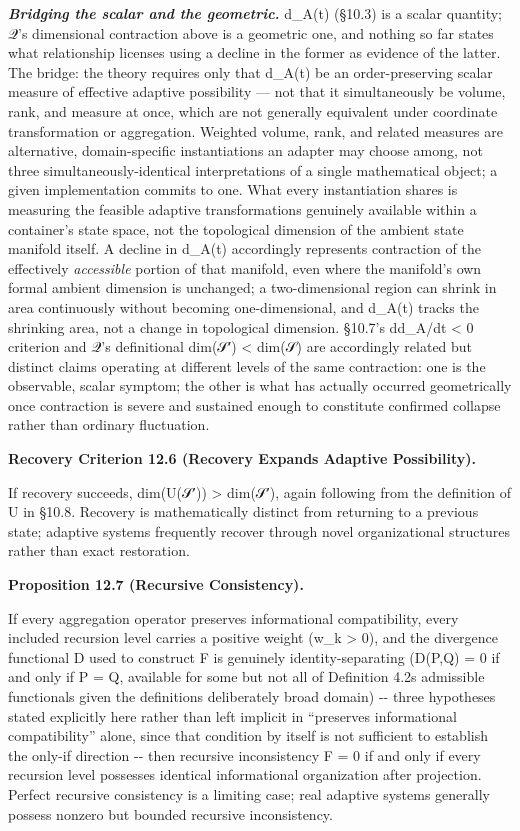 \documentclass[
]{article}
\begin{document}
\emph{\textbf{Bridging the scalar and the geometric.}} d\_A(t) (§10.3)
is a scalar quantity; 𝒬's dimensional contraction above is a geometric
one, and nothing so far states what relationship licenses using a
decline in the former as evidence of the latter. The bridge: the theory
requires only that d\_A(t) be an order-preserving scalar measure of
effective adaptive possibility --- not that it simultaneously be volume,
rank, and measure at once, which are not generally equivalent under
coordinate transformation or aggregation. Weighted volume, rank, and
related measures are alternative, domain-specific instantiations an
adapter may choose among, not three simultaneously-identical
interpretations of a single mathematical object; a given implementation
commits to one. What every instantiation shares is measuring the
feasible adaptive transformations genuinely available within a
container's state space, not the topological dimension of the ambient
state manifold itself. A decline in d\_A(t) accordingly represents
contraction of the effectively \emph{accessible} portion of that
manifold, even where the manifold's own formal ambient dimension is
unchanged; a two-dimensional region can shrink in area continuously
without becoming one-dimensional, and d\_A(t) tracks the shrinking area,
not a change in topological dimension. §10.7's dd\_A/dt \textless{} 0
criterion and 𝒬's definitional dim(𝒮′) \textless{} dim(𝒮) are
accordingly related but distinct claims operating at different levels of
the same contraction: one is the observable, scalar symptom; the other
is what has actually occurred geometrically once contraction is severe
and sustained enough to constitute confirmed collapse rather than
ordinary fluctuation.

\textbf{Recovery Criterion 12.6 (Recovery Expands Adaptive
Possibility).}

If recovery succeeds, dim(U(𝒮′)) \textgreater{} dim(𝒮′), again following
from the definition of U in §10.8. Recovery is mathematically distinct
from returning to a previous state; adaptive systems frequently recover
through novel organizational structures rather than exact restoration.

\textbf{Proposition 12.7 (Recursive Consistency).}

If every aggregation operator preserves informational compatibility,
every included recursion level carries a positive weight (w\_k
\textgreater{} 0), and the divergence functional D used to construct F
is genuinely identity-separating (D(P,Q) = 0 if and only if P = Q,
available for some but not all of Definition 4.2s admissible functionals
given the definitions deliberately broad domain) -\/- three hypotheses
stated explicitly here rather than left implicit in ``preserves
informational compatibility'' alone, since that condition by itself is
not sufficient to establish the only-if direction -\/- then recursive
inconsistency F = 0 if and only if every recursion level possesses
identical informational organization after projection. Perfect recursive
consistency is a limiting case; real adaptive systems generally possess
nonzero but bounded recursive inconsistency.
\end{document}
